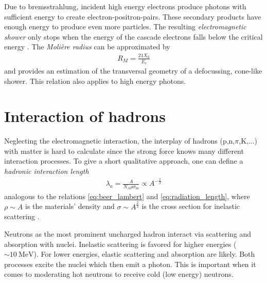 Due to bremsstrahlung, incident high energy electrons produce photons with sufficient energy to create electron-positron-pairs. These secondary products have enough energy to produce even more particles. The resulting \textit{electromagnetic shower} only stops when the energy of the cascade electrons falls below the critical energy \cite{rodnyi}. The \textit{Moli\`{e}re radius} can be approximated by
\begin{align}
R_M=\frac{21X_0}{E_c}
\label{eq:moliere} 
\end{align}
and provides an estimation of the transversal geometry of a defocussing, cone-like shower. This relation also applies to high energy photons.        

\section{Interaction of hadrons}
Neglecting the electromagnetic interaction, the interplay of hadrons (p,n,$\pi$,K,...) with matter is hard to calculate since the strong force knows many different interaction processes. To give a short qualitative approach, one can define a \textit{hadronic interaction length}  
\begin{align}
\lambda_a=\frac{A}{N_A\rho\sigma_{\text{in}}}\propto A^{-\frac{2}{3}}
\end{align}
analogous to the relations \eqref{eq:beer_lambert} and \eqref{eq:radiation_length}, where $\rho\sim A$ is the materials' density and $\sigma\sim A^{\frac{2}{3}}$ is the cross section for inelastic scattering \cite{wermes}. \par 
Neutrons as the most prominent uncharged hadron interact via scattering and absorption with nuclei. Inelastic scattering is favored for higher energies ($\sim \SI{10}{\MeV}$). For lower energies, elastic scattering and absorption are likely. Both processes excite the nuclei which then emit a photon. This is important when it comes to moderating hot neutrons to receive cold (low energy) neutrons. 